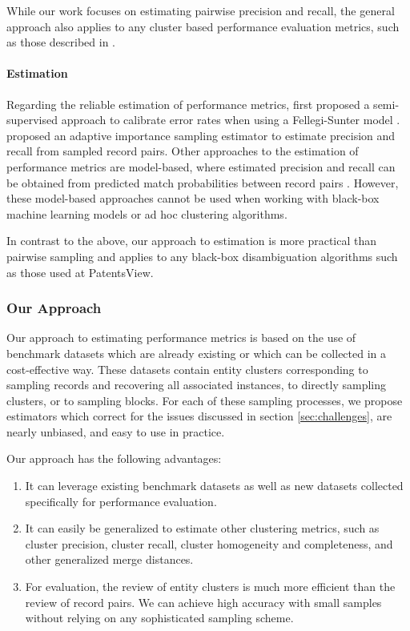 \documentclass[fontsize=11pt]{article}
\theoremstyle{definition}
\begin{document}
{While our work focuses on estimating pairwise precision and recall, the general approach also applies to any cluster based performance evaluation metrics, such as those described in \cite{Michelson2009}.}

\paragraph{Estimation}

Regarding the reliable estimation of performance metrics, \cite{Belin1995} first proposed a semi-supervised approach to calibrate error rates when using a Fellegi-Sunter model \citep{fellegi_theory_1969}. \cite{Marchant2017} proposed an adaptive importance sampling estimator to estimate precision and recall from sampled record pairs. Other approaches to the estimation of performance metrics are model-based, where estimated precision and recall can be obtained from predicted match probabilities between record pairs \citep{enamorado2019using}. However, these model-based approaches cannot be used when working with black-box machine learning models or ad hoc clustering algorithms.

{In contrast to the above, our approach to estimation is more practical than pairwise sampling and applies to any black-box disambiguation algorithms such as those used at PatentsView.}

\subsubsection{Our Approach}\label{sec:approach}

Our approach to estimating performance metrics is based on the use of benchmark datasets which are already existing or which can be collected in a cost-effective way. These datasets contain entity clusters corresponding to sampling records and recovering all associated instances, to directly sampling clusters, or to sampling blocks. For each of these sampling processes, we propose estimators which correct for the issues discussed in section \ref{sec:challenges}, are nearly unbiased, and easy to use in practice.

Our approach has the following advantages:
\begin{enumerate}
    \item It can leverage existing benchmark datasets as well as new datasets collected specifically for performance evaluation.
    \item It can easily be generalized to estimate other clustering metrics, such as cluster precision, cluster recall, cluster homogeneity and completeness, and other generalized merge distances.
    \item For evaluation, the review of entity clusters is much more efficient than the review of record pairs. We can achieve high accuracy with small samples without relying on any sophisticated sampling scheme.
\end{enumerate}
\end{document}
